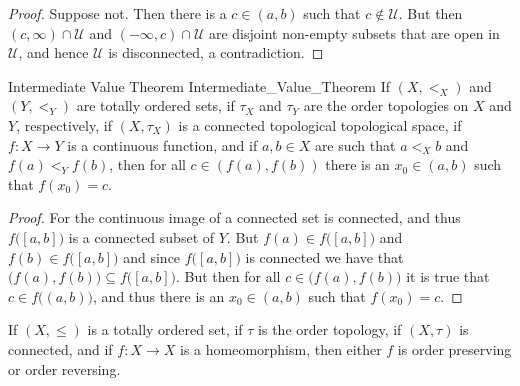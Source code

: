 \documentclass[oneside]{book}                                                  %
\begin{document}
            \begin{proof}
                Suppose not. Then there is a $c\in(a,b)$ such that
                $c\notin\mathcal{U}$. But then $(c,\infty)\cap\mathcal{U}$ and
                $(\minus\infty,c)\cap\mathcal{U}$ are disjoint non-empty subsets
                that are open in $\mathcal{U}$, and hence $\mathcal{U}$ is
                disconnected, a contradiction.
            \end{proof}
            \begin{ltheorem}{Intermediate Value Theorem}
                            {Intermediate_Value_Theorem}
                If $(X,<_{X})$ and $(Y,<_{Y})$ are totally ordered sets, if
                $\tau_{X}$ and $\tau_{Y}$ are the order topologies on $X$ and
                $Y$, respectively, if $(X,\tau_{X})$ is a connected topological
                topological space, if $f:X\rightarrow{Y}$ is a continuous
                function, and if $a,b\in{X}$ are such that $a<_{X}b$ and
                $f(a)<_{Y}f(b)$, then for all $c\in(f(a),f(b))$ there is an
                $x_{0}\in(a,b)$ such that $f(x_{0})=c$.
            \end{ltheorem}
            \begin{proof}
                For the continuous image of a connected set is connected, and
                thus $f\big([a,b]\big)$ is a connected subset of $Y$. But
                $f(a)\in{f}\big([a,b]\big)$ and $f(b)\in{f}\big([a,b]\big)$ and
                since $f\big([a,b]\big)$ is connected we have that
                $\big(f(a),f(b)\big)\subseteq{f}\big([a,b]\big)$. But then for
                all $c\in\big(f(a),f(b)\big)$ it is true that
                $c\in{f}\big((a,b)\big)$, and thus there is an $x_{0}\in(a,b)$
                such that $f(x_{0})=c$.
            \end{proof}
            \begin{theorem}
                If $(X,\leq)$ is a totally ordered set, if $\tau$ is the order
                topology, if $(X,\tau)$ is connected, and if $f:X\rightarrow{X}$
                is a homeomorphism, then either $f$ is order preserving or
                order reversing.
            \end{theorem}
\end{document}
